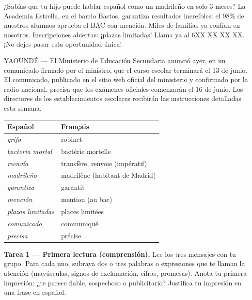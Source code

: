\documentclass[11pt]{article}
\newcounter{popsec}
\newcounter{popsub}
\newcommand{\courssub}[1]{%
  \stepcounter{popsub}%
  \par\vspace{9pt}\noindent{\popxbold\fontsize{11.5}{13}\selectfont\color{popink}{\color{poporange}\thepopsec.\thepopsub}\hspace{6pt}#1}\par\nopagebreak\vspace{4pt}
}
\newcommand{\esp}[1]{\ifmmode\text{\textit{#1}}\else\begingroup\selectlanguage{spanish}\itshape #1\endgroup\fi}
\begin{document}
\begin{textebox}
¿Sabías que tu hijo puede hablar español como un madrileño en solo 3 meses? La Academia Estrella, en el barrio Bastos, garantiza resultados increíbles: el 98\% de nuestros alumnos aprueba el BAC con mención. Miles de familias ya confían en nosotros. Inscripciones abiertas: ¡plazas limitadas! Llama ya al 6XX XX XX XX. ¡No dejes pasar esta oportunidad única!
\end{textebox}

\begin{textebox}
YAOUNDÉ — El Ministerio de Educación Secundaria anunció ayer, en un comunicado firmado por el ministro, que el curso escolar terminará el 13 de junio. El comunicado, publicado en el sitio web oficial del ministerio y confirmado por la radio nacional, precisa que los exámenes oficiales comenzarán el 16 de junio. Los directores de los establecimientos escolares recibirán las instrucciones detalladas esta semana.
\end{textebox}

\begin{aretenir}
\begin{center}
\begin{tabularx}{\linewidth}{|X|X|}
\hline
\rowcolor{popblueL} Español & Français \\
\hline
\esp{grifo} & robinet \\
\esp{bacteria mortal} & bactérie mortelle \\
\esp{reenvía} & transfère, renvoie (impératif) \\
\esp{madrileño} & madrilène (habitant de Madrid) \\
\esp{garantiza} & garantit \\
\esp{mención} & mention (au bac) \\
\esp{plazas limitadas} & places limitées \\
\esp{comunicado} & communiqué \\
\esp{precisa} & précise \\
\hline
\end{tabularx}
\end{center}
\end{aretenir}

\courssub{Consignes}

\textbf{Tarea 1 — Primera lectura (comprensión).} Lee los tres mensajes con tu grupo. Para cada uno, subraya dos o tres palabras o expresiones que te llaman la atención (mayúsculas, signos de exclamación, cifras, promesas). Anota tu primera impresión: ¿te parece fiable, sospechoso o publicitario? Justifica tu impresión en una frase en español.
\end{document}
